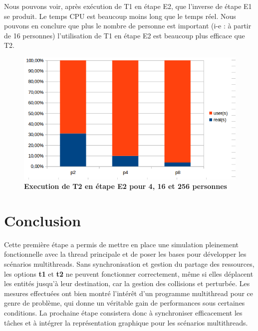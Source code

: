 \documentclass[11pt]{article} %
\begin{document}
Nous pouvons voir, après exécution de T1 en étape E2, que l'inverse de étape E1 se produit. Le temps CPU est beaucoup moins long que le temps réel. Nous pouvons en conclure que plus le nombre de personne est important (i-e : à partir de 16 personnes) l'utilisation de T1 en étape E2 est beaucoup plus efficace que T2.

\begin{figure}[h]
\caption{\label{f2} \textbf{Execution de T2 en étape E2 pour 4, 16 et 256 personnes}}
  \centering
\includegraphics[width=12cm]{e2}
\end{figure}





\newpage


\section{Conclusion}
Cette première étape a permis de mettre en place une simulation pleinement fonctionnelle avec la thread principale et de poser les bases pour développer les scénarios multithreads. Sans synchronisation et gestion du partage des ressources, les options \textbf{t1} et \textbf{t2} ne peuvent fonctionner correctement, même si elles déplacent les entités jusqu'à leur destination, car la gestion des collisions et perturbée. 
Les mesures effectuées ont bien montré l'intérêt d'un programme multithread pour ce genre de problème, qui donne un véritable gain de performances sous certaines conditions. La prochaine étape consistera donc à synchroniser efficacement les tâches et à intégrer la représentation graphique pour les scénarios multithreads.
\end{document}
